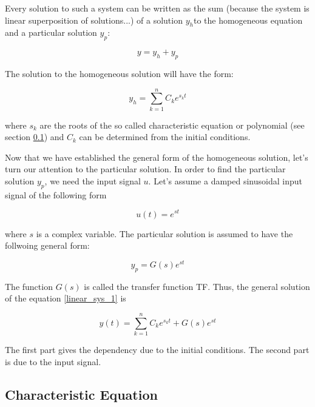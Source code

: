 Every solution to such a system can be written as the sum (because the system is linear superposition of solutions...) of a solution $y_h$to the homogeneous equation and a particular solution $y_p$:


\begin{equation}
y = y_h + y_p
\label{linear_sys_general_sol}
\end{equation}

The solution to the homogeneous solution will have the form:

\begin{equation}
y_h = \sum_{k=1}^{n} C_k e^{s_k t}  
\label{linear_sys_general_ho}
\end{equation}

where $s_k$ are the roots of the so called characteristic equation or polynomial (see section \ref{characteristic_equation}) and  $C_k$ can be determined from the initial conditions. 


Now that we have established the general form of the homogeneous
solution, let's turn our attention to the particular solution.  In order to find the particular solution $y_p$, we need the input signal $u$. Let's assume a damped sinusoidal input signal of the following form

\begin{equation}
u(t) = e^{st}  
\label{linear_sys_input}
\end{equation}

where $s$ is a complex variable.  The particular solution is assumed to have the follwoing general form:


\begin{equation}
y_p= G(s)e^{st}  
\label{linear_sys_general_pa}
\end{equation}

The function $G(s)$ is called the transfer function TF. Thus, the general solution of the equation \ref{linear_sys_1} is


\begin{equation}
y (t) = \sum_{k=1}^{n} C_k e^{s_k t} + G(s)e^{st}  
\label{linear_sys_general_sol_II}
\end{equation}

The first part gives the dependency due to the initial conditions. The second part is due to the input signal.


\subsection{Characteristic Equation}
\label{characteristic_equation}

